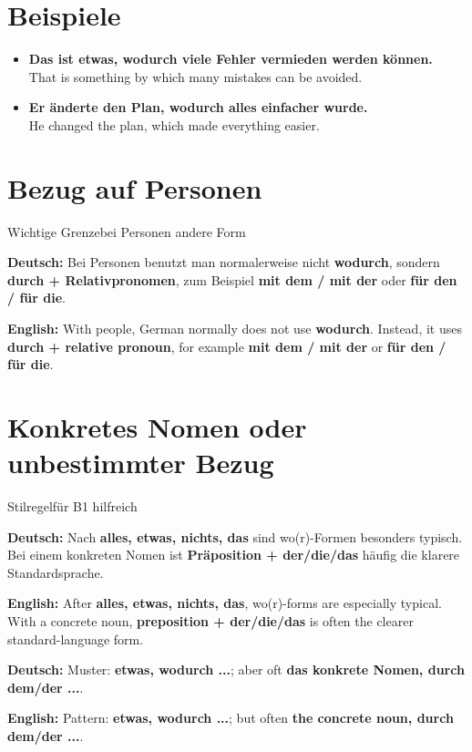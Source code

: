 \documentclass[a4paper,11pt]{article}
\newcommand{\GermanText}[1]{\textbf{Deutsch: }#1\par}
\newcommand{\EnglishText}[1]{{\small\color{SoftGray}\textbf{English: }#1\par}}
\newcommand{\ExampleItem}[2]{\item \textbf{#1}\\{\small\color{SoftGray}#2}}
\begin{document}
\section{Beispiele}

\begin{exbox}

\begin{itemize}

\ExampleItem{Das ist etwas, wodurch viele Fehler vermieden werden können.}{That is something by which many mistakes can be avoided.}

\ExampleItem{Er änderte den Plan, wodurch alles einfacher wurde.}{He changed the plan, which made everything easier.}

\end{itemize}

\end{exbox}

\section{Bezug auf Personen}

\begin{grammarentry}{Wichtige Grenze}{bei Personen andere Form}

\GermanText{Bei Personen benutzt man normalerweise nicht \textbf{wodurch}, sondern \textbf{durch + Relativpronomen}, zum Beispiel \textbf{mit dem / mit der} oder \textbf{für den / für die}.}

\EnglishText{With people, German normally does not use \textbf{wodurch}. Instead, it uses \textbf{durch + relative pronoun}, for example \textbf{mit dem / mit der} or \textbf{für den / für die}.}

\end{grammarentry}

\section{Konkretes Nomen oder unbestimmter Bezug}

\begin{grammarentry}{Stilregel}{für B1 hilfreich}

\GermanText{Nach \textbf{alles, etwas, nichts, das} sind wo(r)-Formen besonders typisch. Bei einem konkreten Nomen ist \textbf{Präposition + der/die/das} häufig die klarere Standardsprache.}

\EnglishText{After \textbf{alles, etwas, nichts, das}, wo(r)-forms are especially typical. With a concrete noun, \textbf{preposition + der/die/das} is often the clearer standard-language form.}

\GermanText{Muster: \textbf{etwas, wodurch ...}; aber oft \textbf{das konkrete Nomen, durch dem/der ...}.}

\EnglishText{Pattern: \textbf{etwas, wodurch ...}; but often \textbf{the concrete noun, durch dem/der ...}.}

\end{grammarentry}
\end{document}
